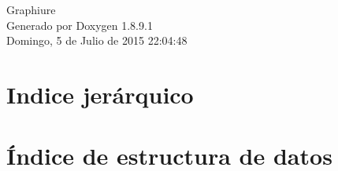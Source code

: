 \documentclass[twoside]{book}
\newcommand{\+}{\discretionary{\mbox{\scriptsize$\hookleftarrow$}}{}{}}
\newcommand{\clearemptydoublepage}{%
  \newpage{\pagestyle{empty}\cleardoublepage}%
}
\begin{document}
\hypersetup{pageanchor=false,
             bookmarks=true,
             bookmarksnumbered=true,
             pdfencoding=unicode
            }
\begin{titlepage}
\vspace*{7cm}
\begin{center}%
{\Large Graphiure }\\
\vspace*{1cm}
{\large Generado por Doxygen 1.8.9.1}\\
\vspace*{0.5cm}
{\small Domingo, 5 de Julio de 2015 22:04:48}\\
\end{center}
\end{titlepage}
\clearemptydoublepage
\tableofcontents
\clearemptydoublepage
{}
\hypersetup{pageanchor=true}

\chapter{Indice jerárquico}

\chapter{Índice de estructura de datos}

\end{document}
